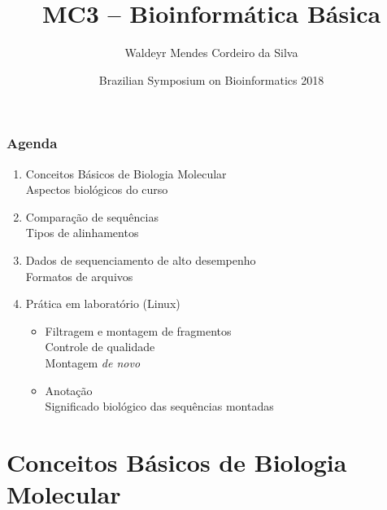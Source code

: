 \documentclass{beamer}
\title{MC3 – Bioinformática Básica}
\subtitle{Waldeyr Mendes Cordeiro da Silva}
\author{Brazilian Symposium on Bioinformatics 2018}
\date{}
\begin{document}
	\setcounter{showProgressBar}{0}
	\setcounter{showSlideNumbers}{0}

	\frame{\titlepage}

	\begin{frame}
		\frametitle{Agenda}
		\begin{enumerate}
			\item Conceitos Básicos de Biologia Molecular\\ \textcolor{ExecusharesGrey}{\footnotesize\hspace{1em} Aspectos biológicos do curso}
			\item Comparação de sequências\\ \textcolor{ExecusharesGrey}{\footnotesize\hspace{1em} Tipos de alinhamentos}
			\item Dados de sequenciamento de alto desempenho\\ \textcolor{ExecusharesGrey}{\footnotesize\hspace{1em} Formatos de arquivos}
			\item Prática em laboratório (Linux)
			\begin{itemize}
				\item Filtragem e montagem de fragmentos\\ 
				\textcolor{ExecusharesGrey}{\footnotesize\hspace{1em} Controle de qualidade}\\
				\textcolor{ExecusharesGrey}{\footnotesize\hspace{1em} Montagem \textit{de novo}}
				\item Anotação\\ \textcolor{ExecusharesGrey}{\footnotesize\hspace{1em} Significado biológico das sequências montadas}
			\end{itemize}
		\end{enumerate}
	\end{frame}

	\setcounter{framenumber}{0}
	\setcounter{showProgressBar}{1}
	\setcounter{showSlideNumbers}{1}
	
	\section{Conceitos Básicos de Biologia Molecular}
	
\end{document}
